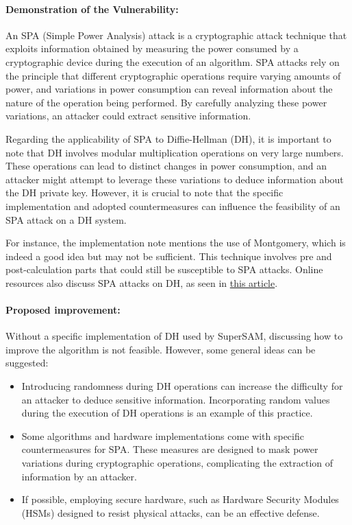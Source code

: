 \documentclass[12pt]{article}
\begin{document}
    \paragraph{Demonstration of the Vulnerability:}
    An SPA (Simple Power Analysis) attack is a cryptographic attack technique that exploits information obtained by measuring the power consumed by a cryptographic device during the execution of an algorithm. SPA attacks rely on the principle that different cryptographic operations require varying amounts of power, and variations in power consumption can reveal information about the nature of the operation being performed. By carefully analyzing these power variations, an attacker could extract sensitive information.
    
    Regarding the applicability of SPA to Diffie-Hellman (DH), it is important to note that DH involves modular multiplication operations on very large numbers. These operations can lead to distinct changes in power consumption, and an attacker might attempt to leverage these variations to deduce information about the DH private key. However, it is crucial to note that the specific implementation and adopted countermeasures can influence the feasibility of an SPA attack on a DH system.
    
    For instance, the implementation note mentions the use of Montgomery, which is indeed a good idea but may not be sufficient. This technique involves pre and post-calculation parts that could still be susceptible to SPA attacks. Online resources also discuss SPA attacks on DH, as seen in \href{https://eprint.iacr.org/2016/995}{this article}.
    
    \paragraph{Proposed improvement:}
    Without a specific implementation of DH used by SuperSAM, discussing how to improve the algorithm is not feasible. However, some general ideas can be suggested:

    \begin{itemize}
        \item Introducing randomness during DH operations can increase the difficulty for an attacker to deduce sensitive information. Incorporating random values during the execution of DH operations is an example of this practice.
        
        \item Some algorithms and hardware implementations come with specific countermeasures for SPA. These measures are designed to mask power variations during cryptographic operations, complicating the extraction of information by an attacker.
        
        \item If possible, employing secure hardware, such as Hardware Security Modules (HSMs) designed to resist physical attacks, can be an effective defense.
    \end{itemize}
\end{document}
